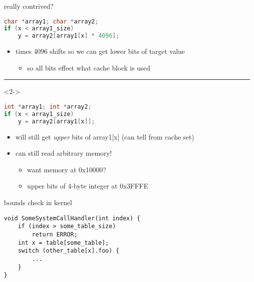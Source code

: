 \begin{frame}[fragile]{really contrived?}
\begin{lstlisting}[language=C,style=smaller]
char *array1; char *array2;
if (x < array1_size)
    y = array2[array1[x] * 4096];
\end{lstlisting}
\begin{itemize}
\item times 4096 shifts so we can get lower bits of target value
    \begin{itemize}
    \item so all bits effect what cache block is used
    \end{itemize}
\end{itemize}
\hrule
\begin{visibleenv}<2->
\begin{lstlisting}[language=C,style=smaller]
int *array1; int *array2;
if (x < array1_size)
    y = array2[array1[x]];
\end{lstlisting}
\begin{itemize}
\item will still get \textit{upper} bits of array1[x] (can tell from cache set)
\item<2-> can still read arbitrary memory!
    \begin{itemize}
    \item want memory at 0x10000?
    \item upper bits of 4-byte integer at 0x3FFFE
    \end{itemize}
\end{itemize}
\end{visibleenv}
\end{frame}

\begin{frame}[fragile]{bounds check in kernel}
\begin{lstlisting}
void SomeSystemCallHandler(int index) {
    if (index > some_table_size) 
        return ERROR;
    int x = table[some_table];
    switch (other_table[x].foo) {
        ...
    }
}
\end{lstlisting}
\end{frame}
